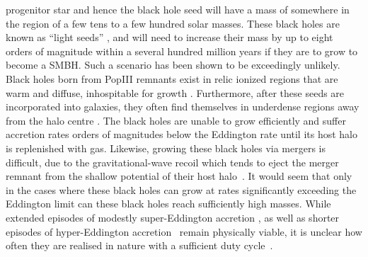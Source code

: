 \documentclass[graphics, twocolumn, usenatbib]{mn2e}
\begin{document}
progenitor star and hence the black hole seed will have a mass of somewhere in the region of a
few tens to a few hundred solar masses. These black holes are known as ``light seeds'' \citep[e.g.][]{Volonteri_2010a}, and will need to increase their mass by up to
eight orders of magnitude within a several hundred million years if they are to grow to become a SMBH. Such
a scenario has been shown to be exceedingly unlikely. Black holes born from PopIII remnants exist
in relic ionized regions that are warm and diffuse, inhospitable for growth
\citep{Whalen_2004, Milosavljevic_2009, Alvarez_2009}. Furthermore, after these seeds are incorporated into galaxies,
they often find themselves in underdense regions away from the halo centre \citep{Smith_2018}.
The black holes
are unable to grow efficiently and suffer accretion rates orders of magnitudes below the Eddington
rate until its host halo is replenished with gas. 
Likewise, growing these black holes via mergers is difficult, due to the gravitational-wave recoil
which tends to eject the merger remnant from the shallow potential of their host halo~\citep{Haiman_2004}.
It would seem that only in the cases where these 
black holes can grow at rates significantly
exceeding the Eddington limit can these black holes reach sufficiently high masses. While extended episodes of modestly 
super-Eddington accretion \citep{Madau_2001, Madau_2014, Alexander_2014,
  Lupi_2016}, as well as shorter episodes of hyper-Eddington accretion~\citep{Inayoshi_2018}
remain physically viable, it is unclear how often they are realised in nature with a
sufficient duty cycle~\citep{Pacucci_2017}.
\end{document}
